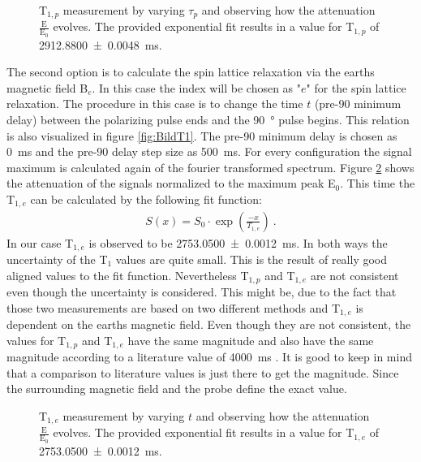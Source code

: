 \begin{figure}[H]
    \centering
    
    \caption[T$_{1,p}$ measurement by varying $\tau_p$ and observing how the attenuation $\frac{\text{E}}{\text{E}_0}$ evolves.]{T$_{1,p}$ measurement by varying $\tau_p$ and observing how the attenuation $\frac{\text{E}}{\text{E}_0}$ evolves.
    The provided exponential fit results in a value for T$_{1,p}$ of \SI{2912.8800 \pm 0.0048}{\milli \second}.}
    \label{fig:T1Polarisationsfeldfeld}
\end{figure}

The second option is to calculate the spin lattice relaxation via the earths magnetic field B$_e$.
In this case the index will be chosen as "$e$" for the spin lattice relaxation.
The procedure in this case is to change the time $t$ (pre-90 minimum delay) between the polarizing pulse ends and the \SI{90}{\degree} pulse begins.
This relation is also visualized in figure \ref{fig:BildT1}.
The pre-90 minimum delay is chosen as \SI{0}{\milli \second} and the pre-90 delay step size as \SI{500}{\milli \second}.
For every configuration the signal maximum is calculated again of the fourier transformed spectrum.
Figure \ref{fig:T1Erdmagnetfeld} shows the attenuation of the signals normalized to the maximum peak E$_0$.
This time the T$_{1,e}$ can be calculated by the following fit function:
\begin{align}
    S(x) = S_0 \cdot \exp\left(\frac{-x}{T_{1,e}}\right) \ .
    \label{eq: fitBe}
\end{align}
In our case T$_{1,e}$ is observed to be \SI{2753.0500 \pm 0.0012}{\milli \second}.\newline
In both ways the uncertainty of the T$_1$ values are quite small.
This is the result of really good aligned values to the fit function.
Nevertheless T$_{1,p}$ and T$_{1,e}$ are not consistent even though the uncertainty is considered.
This might be, due to the fact that those two measurements are based on two different methods and T$_{1,e}$ is dependent on the earths magnetic field.
Even though they are not consistent, the values for T$_{1,p}$ and T$_{1,e}$ have the same magnitude and also have the same magnitude according to a literature value of \SI{4000}{\milli \second} \cite{literaturT1}.
It is good to keep in mind that a comparison to literature values is just there to get the magnitude.
Since the surrounding magnetic field and the probe define the exact value.
\begin{figure}[H]
    \centering
    
    \caption[T$_{1,e}$ measurement by varying $t$ and observing how the attenuation $\frac{\text{E}}{\text{E}_0}$ evolves.]{T$_{1,e}$ measurement by varying $t$ and observing how the attenuation $\frac{\text{E}}{\text{E}_0}$ evolves.
    The provided exponential fit results in a value for T$_{1,e}$ of \SI{2753.0500 \pm 0.0012}{\milli \second}.}
    \label{fig:T1Erdmagnetfeld}
\end{figure}